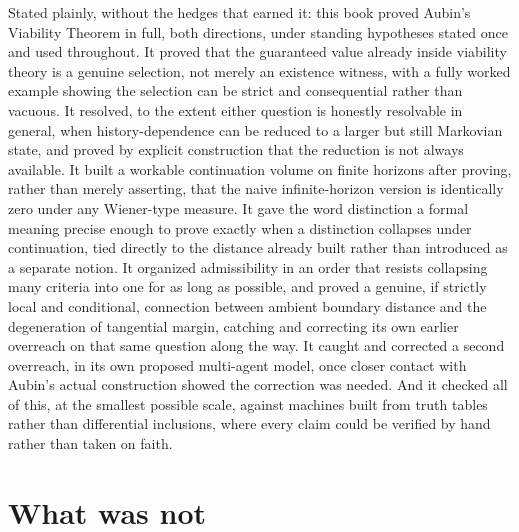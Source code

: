 \documentclass[11pt]{report}
\begin{document}
Stated plainly, without the hedges that earned it: this book proved
Aubin's Viability Theorem in full, both directions, under standing
hypotheses stated once and used throughout. It proved that the
guaranteed value already inside viability theory is a genuine
selection, not merely an existence witness, with a fully worked
example showing the selection can be strict and consequential rather
than vacuous. It resolved, to the extent either question is honestly
resolvable in general, when history-dependence can be reduced to a
larger but still Markovian state, and proved by explicit construction
that the reduction is not always available. It built a workable
continuation volume on finite horizons after proving, rather than
merely asserting, that the naive infinite-horizon version is
identically zero under any Wiener-type measure. It gave the word
distinction a formal meaning precise enough to prove exactly when a
distinction collapses under continuation, tied directly to the
distance already built rather than introduced as a separate notion. It
organized admissibility in an order that resists collapsing many
criteria into one for as long as possible, and proved a genuine, if
strictly local and conditional, connection between ambient boundary
distance and the degeneration of tangential margin, catching and
correcting its own earlier overreach on that same question along the
way. It caught and corrected a second overreach, in its own proposed
multi-agent model, once closer contact with Aubin's actual construction
showed the correction was needed. And it checked all of this, at the
smallest possible scale, against machines built from truth tables
rather than differential inclusions, where every claim could be
verified by hand rather than taken on faith.

\section*{What was not}
\end{document}
